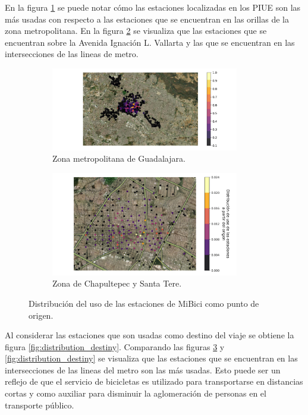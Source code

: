 En la figura \ref{fig:distribution_station_all_origin} se puede notar cómo las estaciones localizadas en los PIUE son las más usadas con respecto a las estaciones que se encuentran en las orillas de la zona metropolitana. En la figura \ref{fig:distribution_station_zoom_origin} se visualiza que las estaciones que se encuentran sobre la Avenida Ignación L. Vallarta y las que se encuentran en las intersecciones de las lineas de metro.

\begin{figure}[H]
    \centering
    \begin{subfigure}[b]{8.2cm}
        \includegraphics[width=8.2cm]{Graphics/repetition_origen.png}
        \caption{Zona metropolitana de Guadalajara.}
        \label{fig:distribution_station_all_origin}
    \end{subfigure}
    \begin{subfigure}[b]{8.2cm}
        \includegraphics[width=8.2cm]{Graphics/repetition_origen_zoom.png}
        \caption{Zona de Chapultepec y Santa Tere.}
        \label{fig:distribution_station_zoom_origin}
    \end{subfigure}
    \caption{Distribución del uso de las estaciones de MiBici como punto de origen.}
    \label{fig:distribution_origin}
\end{figure}

Al considerar las estaciones que son usadas como destino del viaje se obtiene la figura \ref{fig:distribution_destiny}. Comparando las figuras \ref{fig:distribution_origin} y \ref{fig:distribution_destiny} se visualiza que las estaciones que se encuentran en las intersecciones de las lineas del metro son las más usadas. Esto puede ser un reflejo de que el servicio de bicicletas es utilizado para transportarse en distancias cortas y como auxiliar para disminuir la aglomeración de personas en el transporte público.

